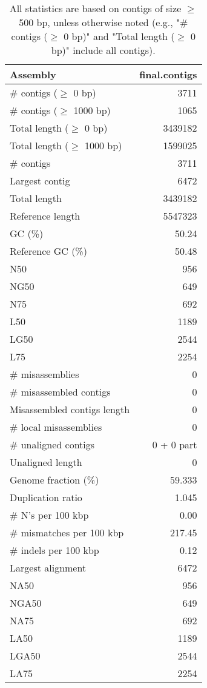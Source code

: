 \documentclass[12pt,a4paper]{article}
\begin{document}
\begin{table}[ht]
\begin{center}
\caption{All statistics are based on contigs of size $\geq$ 500 bp, unless otherwise noted (e.g., "\# contigs ($\geq$ 0 bp)" and "Total length ($\geq$ 0 bp)" include all contigs).}
\begin{tabular}{|l*{1}{|r}|}
\hline
Assembly & final.contigs \\ \hline
\# contigs ($\geq$ 0 bp) & 3711 \\ \hline
\# contigs ($\geq$ 1000 bp) & 1065 \\ \hline
Total length ($\geq$ 0 bp) & 3439182 \\ \hline
Total length ($\geq$ 1000 bp) & 1599025 \\ \hline
\# contigs & 3711 \\ \hline
Largest contig & 6472 \\ \hline
Total length & 3439182 \\ \hline
Reference length & 5547323 \\ \hline
GC (\%) & 50.24 \\ \hline
Reference GC (\%) & 50.48 \\ \hline
N50 & 956 \\ \hline
NG50 & 649 \\ \hline
N75 & 692 \\ \hline
L50 & 1189 \\ \hline
LG50 & 2544 \\ \hline
L75 & 2254 \\ \hline
\# misassemblies & 0 \\ \hline
\# misassembled contigs & 0 \\ \hline
Misassembled contigs length & 0 \\ \hline
\# local misassemblies & 0 \\ \hline
\# unaligned contigs & 0 + 0 part \\ \hline
Unaligned length & 0 \\ \hline
Genome fraction (\%) & 59.333 \\ \hline
Duplication ratio & 1.045 \\ \hline
\# N's per 100 kbp & 0.00 \\ \hline
\# mismatches per 100 kbp & 217.45 \\ \hline
\# indels per 100 kbp & 0.12 \\ \hline
Largest alignment & 6472 \\ \hline
NA50 & 956 \\ \hline
NGA50 & 649 \\ \hline
NA75 & 692 \\ \hline
LA50 & 1189 \\ \hline
LGA50 & 2544 \\ \hline
LA75 & 2254 \\ \hline
\end{tabular}
\end{center}
\end{table}
\end{document}
